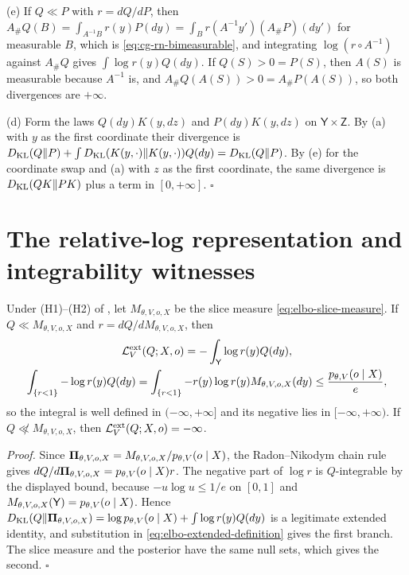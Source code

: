 (e) If $Q\ll P$ with $r=dQ/dP$, then $A_\#Q(B)=\int_{A^{-1}B}r(y)P(dy)=\int_Br(A^{-1}y')(A_\#P)(dy')$ for measurable
$B$, which is \eqref{eq:cg-rn-bimeasurable}, and integrating $\log(r\circ A^{-1})$ against $A_\#Q$ gives
$\int\log r(y)Q(dy)$. If $Q(S)>0=P(S)$, then $A(S)$ is measurable because $A^{-1}$ is, and
$A_\#Q(A(S))>0=A_\#P(A(S))$, so both divergences are $+\infty$.

(d) Form the laws $Q(dy)K(y,dz)$ and $P(dy)K(y,dz)$ on $\mathsf Y\times\mathsf Z$. By (a) with $y$ as the first
coordinate their divergence is $D_{\mathrm{KL}}(Q\Vert P)+\int D_{\mathrm{KL}}(K(y,\cdot)\Vert K(y,\cdot))Q(dy)=D_{\mathrm{KL}}(Q\Vert P)$. By (e) for the
coordinate swap and (a) with $z$ as the first coordinate, the same divergence is $D_{\mathrm{KL}}(QK\Vert PK)$ plus a term
in $[0,+\infty]$. \hfill$\square$

\section{The relative-log representation and integrability witnesses}
\label{sec:app-integrability-witnesses}

Under (H1)--(H2) of , let $M_{\theta,V,o,X}$ be the slice measure
\eqref{eq:elbo-slice-measure}. If $Q\ll M_{\theta,V,o,X}$ and $r=dQ/dM_{\theta,V,o,X}$, then
\begin{equation}
\begin{gathered}
\mathcal L_V^{\mathrm{ext}}(Q;X,o)=-\int_{\mathsf Y}\log r(y)Q(dy),\\
\int_{\{r<1\}}-\log r(y)Q(dy)=\int_{\{r<1\}}-r(y)\log r(y)M_{\theta,V,o,X}(dy)\leq\frac{p_{\theta,V}(o\mid X)}{e},
\end{gathered}
\label{eq:elbo-relative-log}
\end{equation}
so the integral is well defined in $(-\infty,+\infty]$ and its negative lies in $[-\infty,+\infty)$. If
$Q\not\ll M_{\theta,V,o,X}$, then $\mathcal L_V^{\mathrm{ext}}(Q;X,o)=-\infty$. 

\noindent\emph{Proof.}
Since $\boldsymbol\Pi_{\theta,V,o,X}=M_{\theta,V,o,X}/p_{\theta,V}(o\mid X)$, the Radon--Nikodym chain rule gives
$dQ/d\boldsymbol\Pi_{\theta,V,o,X}=p_{\theta,V}(o\mid X)r$. The negative part of $\log r$ is $Q$-integrable by the
displayed bound, because $-u\log u\leq1/e$ on $[0,1]$ and $M_{\theta,V,o,X}(\mathsf Y)=p_{\theta,V}(o\mid X)$.
Hence $D_{\mathrm{KL}}(Q\Vert\boldsymbol\Pi_{\theta,V,o,X})=\log p_{\theta,V}(o\mid X)+\int\log r(y)Q(dy)$ is a legitimate extended
identity, and substitution in \eqref{eq:elbo-extended-definition} gives the first branch. The slice measure and
the posterior have the same null sets, which gives the second. \hfill$\square$


